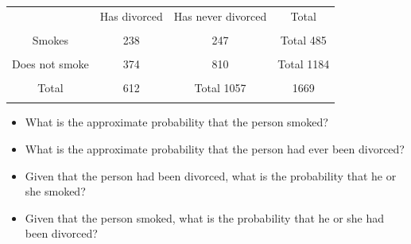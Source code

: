 \documentclass[
]{report}
\providecommand{\tightlist}{%
  \setlength{\itemsep}{0pt}\setlength{\parskip}{0pt}}
\begin{document}
\begin{center}
\begin{tabular}{|c|c|c|c|} \hline
\hspace{0.8in} & \hspace{0.35in} Has divorced \hspace{.35in} & \hspace{0.35in} Has never divorced  \hspace{0.35in} & \hspace{0.3in} Total \hspace{0.3in} \\ 
& & & \\ \hline
Smokes & 238 & 247 & Total 485 \\ 
& & & \\ \hline
Does not smoke & 374 & 810 & Total 1184 \\ 
& & & \\ \hline
Total & 612 & Total 1057 & 1669 \\ 
& & & \\ \hline
\end{tabular}
\end{center}
\vspace{.1in}

\begin{itemize}
\tightlist
\item
  What is the approximate probability that the person smoked?
\end{itemize}

\vspace{0.5in}

\begin{itemize}
\tightlist
\item
  What is the approximate probability that the person had ever been divorced?
\end{itemize}

\vspace{0.5in}

\begin{itemize}
\tightlist
\item
  Given that the person had been divorced, what is the probability that he or she smoked?
\end{itemize}

\vspace{0.5in}

\begin{itemize}
\tightlist
\item
  Given that the person smoked, what is the probability that he or she had been divorced?
\end{itemize}
\end{document}

